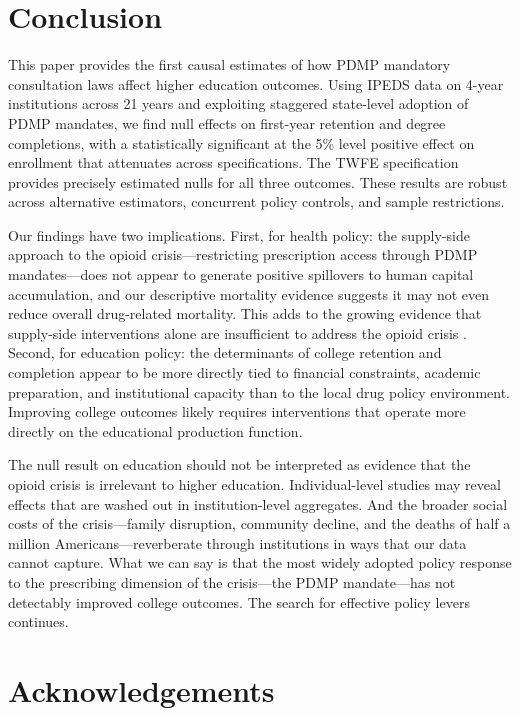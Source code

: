 \documentclass[12pt]{article}
\begin{document}
\section{Conclusion}

This paper provides the first causal estimates of how PDMP mandatory consultation laws affect higher education outcomes. Using IPEDS data on 4-year institutions across 21 years and exploiting staggered state-level adoption of PDMP mandates, we find null effects on first-year retention and degree completions, with a statistically significant at the 5\% level positive effect on enrollment that attenuates across specifications. The TWFE specification provides precisely estimated nulls for all three outcomes. These results are robust across alternative estimators, concurrent policy controls, and sample restrictions.

Our findings have two implications. First, for health policy: the supply-side approach to the opioid crisis---restricting prescription access through PDMP mandates---does not appear to generate positive spillovers to human capital accumulation, and our descriptive mortality evidence suggests it may not even reduce overall drug-related mortality. This adds to the growing evidence that supply-side interventions alone are insufficient to address the opioid crisis \citep{alpert2018supply, evans2019opioid, mallatt2022effect}. Second, for education policy: the determinants of college retention and completion appear to be more directly tied to financial constraints, academic preparation, and institutional capacity \citep{bound2010have, dynarski2021act, denning2019propensity, lovenheim2011effect} than to the local drug policy environment. Improving college outcomes likely requires interventions that operate more directly on the educational production function.

The null result on education should not be interpreted as evidence that the opioid crisis is irrelevant to higher education. Individual-level studies may reveal effects that are washed out in institution-level aggregates. And the broader social costs of the crisis---family disruption, community decline, and the deaths of half a million Americans---reverberate through institutions in ways that our data cannot capture. What we can say is that the most widely adopted policy response to the prescribing dimension of the crisis---the PDMP mandate---has not detectably improved college outcomes. The search for effective policy levers continues.


\section*{Acknowledgements}
\end{document}
